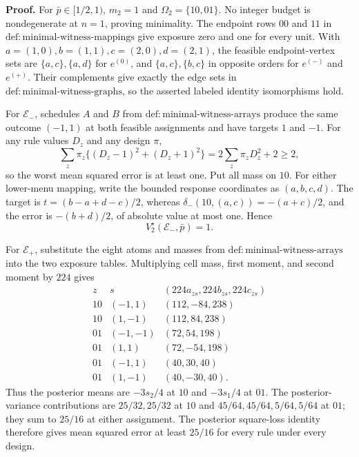 \textbf{Proof.}
For \(\bar p\in[1/2,1)\), \(m_2=1\) and \(\Omega_2=\{10,01\}\). No integer budget is nondegenerate at \(n=1\), proving minimality. The endpoint rows \(00\) and \(11\) in \(\mathrm{def{:}minimal\text{-}witness\text{-}mappings}\) give exposure zero and one for every unit. With \(a=(1,0),b=(1,1),c=(2,0),d=(2,1)\), the feasible endpoint-vertex sets are \(\{a,c\},\{a,d\}\) for \(e^{(0)}\), and \(\{a,c\},\{b,c\}\) in opposite orders for \(e^{(-)}\) and \(e^{(+)}\). Their complements give exactly the edge sets in \(\mathrm{def{:}minimal\text{-}witness\text{-}graphs}\), so the asserted labeled identity isomorphisms hold.

For \(\mathcal E_-\), schedules \(A\) and \(B\) from \(\mathrm{def{:}minimal\text{-}witness\text{-}arrays}\) produce the same outcome \((-1,1)\) at both feasible assignments and have targets \(1\) and \(-1\). For any rule values \(D_z\) and any design \(\pi\),
\[
 \sum_z\pi_z\{(D_z-1)^2+(D_z+1)^2\}
 =2\sum_z\pi_zD_z^2+2\ge2,
\]
so the worst mean squared error is at least one. Put all mass on \(10\). For either lower-menu mapping, write the bounded response coordinates as \((a,b,c,d)\). The target is \(t=(b-a+d-c)/2\), whereas \(\delta_-(10,(a,c))=-(a+c)/2\), and the error is \(-(b+d)/2\), of absolute value at most one. Hence
\[
 V_2^\star(\mathcal E_-,\bar p)=1. \tag{1}
\]

For \(\mathcal E_+\), substitute the eight atoms and masses from \(\mathrm{def{:}minimal\text{-}witness\text{-}arrays}\) into the two exposure tables. Multiplying cell mass, first moment, and second moment by \(224\) gives
\[
\begin{array}{c|c|c}
z&s&(224a_{zs},224b_{zs},224c_{zs})\\ \hline
10&(-1,1)&(112,-84,238)\\
10&(1,-1)&(112,84,238)\\
01&(-1,-1)&(72,54,198)\\
01&(1,1)&(72,-54,198)\\
01&(-1,1)&(40,30,40)\\
01&(1,-1)&(40,-30,40).
\end{array} \tag{2}
\]
Thus the posterior means are \(-3s_2/4\) at \(10\) and \(-3s_1/4\) at \(01\). The posterior-variance contributions are \(25/32,25/32\) at \(10\) and \(45/64,45/64,5/64,5/64\) at \(01\); they sum to \(25/16\) at either assignment. The posterior square-loss identity therefore gives mean squared error at least \(25/16\) for every rule under every design.

